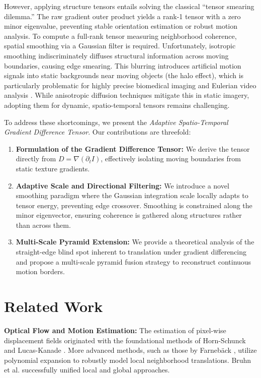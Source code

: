 \documentclass[preprint,12pt]{elsarticle}
\begin{document}
However, applying structure tensors entails solving the classical ``tensor smearing dilemma.'' The raw gradient outer product yields a rank-1 tensor with a zero minor eigenvalue, preventing stable orientation estimation or robust motion analysis. To compute a full-rank tensor measuring neighborhood coherence, spatial smoothing via a Gaussian filter is required. Unfortunately, isotropic smoothing indiscriminately diffuses structural information across moving boundaries, causing edge smearing. This blurring introduces artificial motion signals into static backgrounds near moving objects (the halo effect), which is particularly problematic for highly precise biomedical imaging and Eulerian video analysis \cite{Wu2012}. While anisotropic diffusion techniques \cite{Weickert1999} mitigate this in static imagery, adopting them for dynamic, spatio-temporal tensors remains challenging.

To address these shortcomings, we present the \textit{Adaptive Spatio-Temporal Gradient Difference Tensor}. Our contributions are threefold:
\begin{enumerate}
    \item \textbf{Formulation of the Gradient Difference Tensor:} We derive the tensor directly from $D = \nabla(\partial_t I)$, effectively isolating moving boundaries from static texture gradients.
    \item \textbf{Adaptive Scale and Directional Filtering:} We introduce a novel smoothing paradigm where the Gaussian integration scale locally adapts to tensor energy, preventing edge crossover. Smoothing is constrained along the minor eigenvector, ensuring coherence is gathered along structures rather than across them.
    \item \textbf{Multi-Scale Pyramid Extension:} We provide a theoretical analysis of the straight-edge blind spot inherent to translation under gradient differencing and propose a multi-scale pyramid fusion strategy to reconstruct continuous motion borders.
\end{enumerate}

\section{Related Work}
\label{sec:related}

\textbf{Optical Flow and Motion Estimation:} The estimation of pixel-wise displacement fields originated with the foundational methods of Horn-Schunck \cite{Horn1981} and Lucas-Kanade \cite{LucasKanade1981}. More advanced methods, such as those by Farneb{\"a}ck \cite{Farneback2003}, utilize polynomial expansion to robustly model local neighborhood translations. Bruhn et al. \cite{Bruhn2005} successfully unified local and global approaches. 
\end{document}
